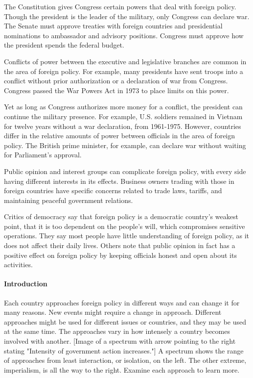 The Constitution gives Congress certain powers that deal with foreign policy.
Though the president is the leader of the military, only Congress can declare
war. The Senate must approve treaties with foreign countries and presidential
nominations to ambassador and advisory positions. Congress must approve how the
president spends the federal budget.

Conflicts of power between the executive and legislative branches are common in
the area of foreign policy. For example, many presidents have sent troops into a
conflict without prior authorization or a declaration of war from Congress.
Congress passed the War Powers Act in 1973 to place limits on this power.

Yet as long as Congress authorizes more money for a conflict, the president can
continue the military presence. For example, U.S. soldiers remained in Vietnam
for twelve years without a war declaration, from 1961-1975. However, countries
differ in the relative amounts of power between officials in the area of foreign
policy. The British prime minister, for example, can declare war without waiting
for Parliament's approval.

Public opinion and interest groups can complicate foreign policy, with every
side having different interests in its effects. Business owners trading with
those in foreign countries have specific concerns related to trade laws,
tariffs, and maintaining peaceful government relations.

Critics of democracy say that foreign policy is a democratic country's weakest
point, that it is too dependent on the people's will, which compromises
sensitive operations. They say most people have little understanding of foreign
policy, as it does not affect their daily lives. Others note that public opinion
in fact has a positive effect on foreign policy by keeping officials honest and
open about its activities.

\paragraph{Introduction} Each country approaches foreign policy in different
ways and can change it for many reasons. New events might require a change in
approach. Different approaches might be used for different issues or countries,
and they may be used at the same time. The approaches vary in how intensely a
country becomes involved with another. [Image of a spectrum with arrow pointing
to the right stating "Intensity of government action increases."] A spectrum
shows the range of approaches from least interaction, or isolation, on the left.
The other extreme, imperialism, is all the way to the right. Examine each
approach to learn more.

